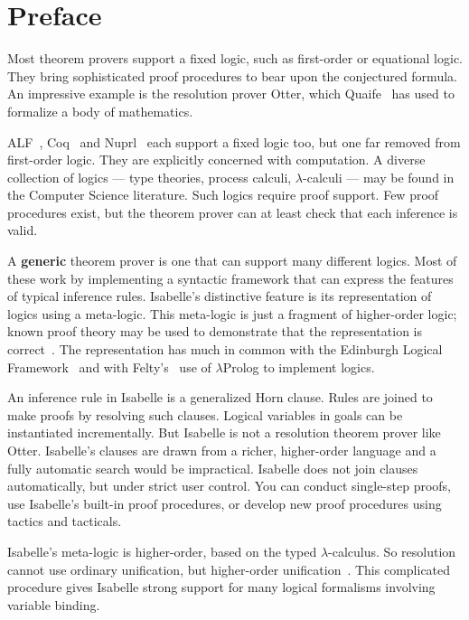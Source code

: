 \chapter*{Preface}


Most theorem provers support a fixed logic, such as first-order or
equational logic.  They bring sophisticated proof procedures to bear upon
the conjectured formula.  An impressive example is the resolution prover
Otter, which Quaife~\cite{quaife-book} has used to formalize a body of
mathematics.

ALF~\cite{alf}, Coq~\cite{coq} and Nuprl~\cite{constable86} each support a
fixed logic too, but one far removed from first-order logic.  They are
explicitly concerned with computation.  A diverse collection of logics ---
type theories, process calculi, $\lambda$-calculi --- may be found in the
Computer Science literature.  Such logics require proof support.  Few proof
procedures exist, but the theorem prover can at least check that each
inference is valid.

A {\bf generic} theorem prover is one that can support many different
logics.  Most of these \cite{dawson90,mural,sawamura92} work by
implementing a syntactic framework that can express the features of typical
inference rules.  Isabelle's distinctive feature is its representation of
logics using a meta-logic.  This meta-logic is just a fragment of
higher-order logic; known proof theory may be used to demonstrate that the
representation is correct~\cite{paulson89}.  The representation has much in
common with the Edinburgh Logical Framework~\cite{harper-jacm} and with 
Felty's~\cite{felty93} use of $\lambda$Prolog to implement logics.

An inference rule in Isabelle is a generalized Horn clause.  Rules are
joined to make proofs by resolving such clauses.  Logical variables in
goals can be instantiated incrementally.  But Isabelle is not a resolution
theorem prover like Otter.  Isabelle's clauses are drawn from a richer,
higher-order language and a fully automatic search would be impractical.
Isabelle does not join clauses automatically, but under strict user
control.  You can conduct single-step proofs, use Isabelle's built-in proof
procedures, or develop new proof procedures using tactics and tacticals.

Isabelle's meta-logic is higher-order, based on the typed
$\lambda$-calculus.  So resolution cannot use ordinary unification, but
higher-order unification~\cite{huet75}.  This complicated procedure gives
Isabelle strong support for many logical formalisms involving variable
binding.

